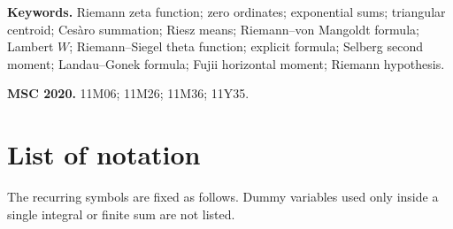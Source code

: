 \documentclass[11pt]{amsart}
\numberwithin{equation}{section}
\theoremstyle{definition}
\theoremstyle{remark}
\begin{document}
\maketitle

\noindent\textbf{Keywords.} Riemann zeta function; zero ordinates; exponential sums; triangular centroid; Cesàro summation; Riesz means; Riemann--von Mangoldt formula; Lambert $W$; Riemann--Siegel theta function; explicit formula; Selberg second moment; Landau--Gonek formula; Fujii horizontal moment; Riemann hypothesis.

\medskip
\noindent\textbf{MSC 2020.} 11M06; 11M26; 11M36; 11Y35.


\tableofcontents
\newpage

\section*{List of notation}\label{sec:notation}
The recurring symbols are fixed as follows. Dummy variables used only inside a single integral or finite sum are not listed.
\end{document}
